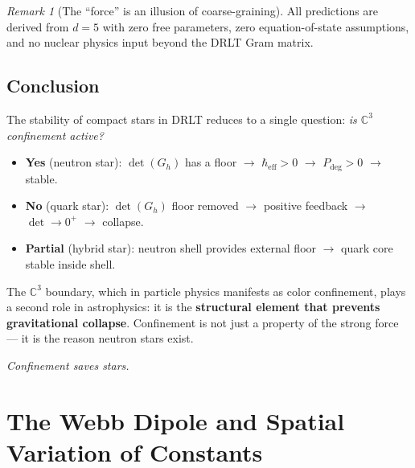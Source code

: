 \documentclass[12pt]{article}
\theoremstyle{remark}
\newtheorem{remark}[theorem]{Remark}
\theoremstyle{definition}
\newcommand{\CC}{\mathbb{C}}
\begin{document}
\begin{remark}[The ``force'' is an illusion of coarse-graining]
All predictions are derived from $d = 5$ with zero free parameters, zero equation-of-state assumptions, and no nuclear physics input beyond the DRLT Gram matrix.

\subsection{Conclusion}

The stability of compact stars in DRLT reduces to a single question: \emph{is $\CC^3$ confinement active?}

\begin{itemize}
\item \textbf{Yes} (neutron star): $\det(G_h)$ has a floor $\to$ $\hbar_\text{eff} > 0$ $\to$ $P_\text{deg} > 0$ $\to$ stable.
\item \textbf{No} (quark star): $\det(G_h)$ floor removed $\to$ positive feedback $\to$ $\det \to 0^+$ $\to$ collapse.
\item \textbf{Partial} (hybrid star): neutron shell provides external floor $\to$ quark core stable inside shell.
\end{itemize}

The $\CC^3$ boundary, which in particle physics manifests as color confinement, plays a second role in astrophysics: it is the \textbf{structural element that prevents gravitational collapse}. Confinement is not just a property of the strong force --- it is the reason neutron stars exist.

\begin{center}
\emph{Confinement saves stars.}
\end{center}



\section{The Webb Dipole and Spatial Variation of Constants}
\label{ch:webb_dipole}


\end{remark}
\end{document}
